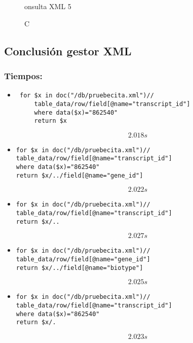 \documentclass[12pt,a4paper]{article}
\begin{document}
\begin{figure}[!h]
\centering
{}
\caption Consulta XML 5
\label{xml5}
\end{figure}


\newpage

\subsection{Conclusión gestor XML}  \label{pto43}

\subsubsection{Tiempos:}  \label{pto431}

\begin{itemize}
\item 
\begin{verbatim}
 for $x in doc("/db/pruebecita.xml")//
     table_data/row/field[@name="transcript_id"]
     where data($x)="862540"
     return $x
\end{verbatim}

$$2.018s$$

\item 
\begin{verbatim}
for $x in doc("/db/pruebecita.xml")//
table_data/row/field[@name="transcript_id"]
where data($x)="862540"
return $x/../field[@name="gene_id"]
\end{verbatim}

$$2.022s$$

\item 
\begin{verbatim}
for $x in doc("/db/pruebecita.xml")//
table_data/row/field[@name="transcript_id"]
return $x/..
\end{verbatim}

$$2.027s$$

\item 
\begin{verbatim}
for $x in doc("/db/pruebecita.xml")//
table_data/row/field[@name="gene_id"]
return $x/../field[@name="biotype"]
\end{verbatim}

$$2.025s$$

\item 
\begin{verbatim}
for $x in doc("/db/pruebecita.xml")//
table_data/row/field[@name="transcript_id"]
where data($x)="862540"
return $x/.
\end{verbatim}

$$2.023s$$


\end{itemize}
\end{document}
